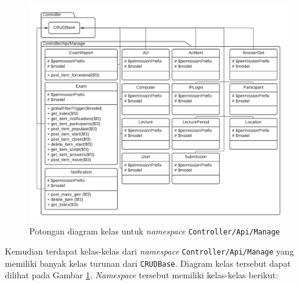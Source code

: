     \begin{figure}
        \centering
        \includegraphics{Gambar/classmap-be/Classmap - app-controller-api-manage.pdf}
        \caption{Potongan diagram kelas untuk \textit{namespace}
        \texttt{Controller/Api/Manage}}
        \label{fig:classmap_app-controller-api-manage}
    \end{figure}
    Kemudian terdapat kelas-kelas dari \textit{namespace}
    \texttt{Controller/Api/Manage} yang memiliki banyak kelas turunan dari
    \texttt{CRUDBase}. Diagram kelas tersebut dapat dilihat pada Gambar
    \ref{fig:classmap_app-controller-api-manage}. \textit{Namespace} tersebut
    memiliki kelas-kelas berikut:
